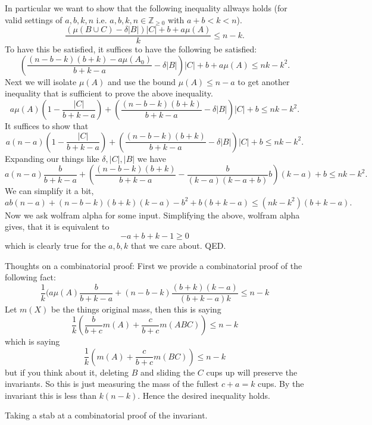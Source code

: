 \documentclass[twocolumn]{article}[11pt]
\begin{document}
In particular we want to show that the following inequality allways holds (for valid settings of $a,b,k,n$ i.e. $a,b,k,n \in \mathbb{Z}_{\ge0}$ with $a+b<k<n$).
$$\frac{(\mu(B\cup C) -\delta|B|)|C| + b + a\mu(A)}{k} \le n-k.$$
To have this be satisfied, it suffices to have the following be satisfied:
$$ \left(\frac{(n-b-k)(b+k) - a\mu(A_0)}{b+k-a} - \delta|B|\right)|C| + b + a \mu(A) \le nk - k^2.$$
Next we will isolate $\mu(A)$ and use the bound $\mu(A) \le n-a$ to get another inequality that is sufficient to prove the above inequality.
$$ a\mu(A) \left( 1-\frac{|C|}{b+k-a} \right) + \left(\frac{(n-b-k)(b+k)}{b+k-a}-\delta|B|\right)|C| + b\le nk-k^2.$$
It suffices to show that
$$ a(n-a) \left( 1-\frac{|C|}{b+k-a} \right) + \left(\frac{(n-b-k)(b+k)}{b+k-a}-\delta|B|\right)|C| + b\le nk-k^2.$$
Expanding our things like $\delta, |C|, |B|$ we have
$$ a(n-a) \frac{b}{b+k-a} + \left(\frac{(n-b-k)(b+k)}{b+k-a}-\frac{b}{(k-a)(k-a+b)} b\right)(k-a) + b\le nk-k^2.$$
We can simplify it a bit,
$$ ab(n-a) + (n-b-k)(b+k)(k-a)- b^2 + b(b+k-a)  \le (nk-k^2)(b+k-a).$$
Now we ask wolfram alpha for some input. Simplifying the above, wolfram alpha gives, that it is equivalent to 
$$-a+b+k-1\ge 0$$ 
which is clearly true for the $a,b,k$ that we care about. QED.

Thoughts on a combinatorial proof:
First we provide a combinatorial proof of the following fact:
$$\frac{1}{k}(a\mu(A)\frac{b}{b+k-a} + (n-b-k)\frac{(b+k)(k-a)}{(b+k-a)k} \le n-k$$
Let $m(X)$ be the things original mass, then this is saying
$$\frac{1}{k}(\frac{b}{b+c} m(A) + \frac{c}{b+c} m(ABC)) \le n-k$$
which is saying
$$\frac{1}{k}(m(A) + \frac{c}{b+c} m(BC)) \le n-k$$
but if you think about it, deleting $B$ and sliding the $C$ cups up will preserve the invariants. So this is just measuring the mass of the fullest $c+a = k$ cups. By the invariant this is less than $k(n-k)$.
Hence the desired inequality holds.

Taking a stab at a combinatorial proof of the invariant.
\end{document}
